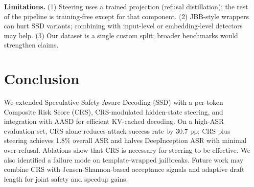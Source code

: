\documentclass[11pt,a4paper]{article}
\begin{document}
\textbf{Limitations.} (1) Steering uses a trained projection (refusal distillation); the rest of the pipeline is training-free except for that component. (2) JBB-style wrappers can hurt SSD variants; combining with input-level or embedding-level detectors may help. (3) Our dataset is a single custom split; broader benchmarks would strengthen claims.

\section{Conclusion}
\label{sec:conclusion}

We extended Speculative Safety-Aware Decoding (SSD) with a per-token Composite Risk Score (CRS), CRS-modulated hidden-state steering, and integration with AASD for efficient KV-cached decoding. On a high-ASR evaluation set, CRS alone reduces attack success rate by 30.7 pp; CRS plus steering achieves 1.8\% overall ASR and halves DeepInception ASR with minimal over-refusal. Ablations show that CRS is necessary for steering to be effective. We also identified a failure mode on template-wrapped jailbreaks. Future work may combine CRS with Jensen-Shannon-based acceptance signals and adaptive draft length for joint safety and speedup gains.

\small


\end{document}
